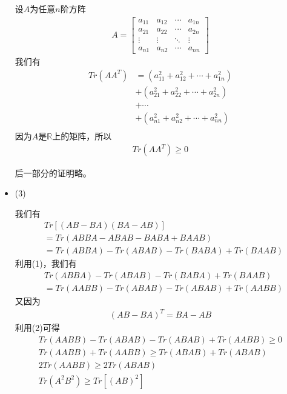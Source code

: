 \documentclass{article}
\begin{document}
\begin{itemize}
        设$A$为任意$n$阶方阵
        \begin{align*}
          A = \begin{bmatrix}
                a_{11} & a_{12} & \cdots & a_{1n} \\
                a_{21} & a_{22} & \cdots & a_{2n} \\
                \vdots & \vdots & \ddots & \vdots \\
                a_{n1} & a_{n2} & \cdots & a_{nn}
              \end{bmatrix}
        \end{align*}
        我们有
        \begin{align*}
          Tr(AA^T) & = (a_{11}^2 + a_{12}^2 + \cdots + a_{1n}^2) \\
                   & + (a_{21}^2 + a_{22}^2 + \cdots + a_{2n}^2) \\
                   & + \cdots                                    \\
                   & + (a_{n1}^2 + a_{n2}^2 + \cdots + a_{nn}^2) \\
        \end{align*}
        因为$A$是$\mathbb{R}$上的矩阵，所以
        \begin{align*}
          Tr(AA^T) \geq 0
        \end{align*}

        后一部分的证明略。

  \item (3)

        我们有
        \begin{align*}
           & Tr[(AB - BA)(BA - AB)]                      \\
           & = Tr(ABBA - ABAB - BABA + BAAB)             \\
           & = Tr(ABBA) - Tr(ABAB) - Tr(BABA) + Tr(BAAB)
        \end{align*}
        利用(1)，我们有
        \begin{align*}
           & Tr(ABBA) - Tr(ABAB) - Tr(BABA) + Tr(BAAB)   \\
           & = Tr(AABB) - Tr(ABAB) - Tr(ABAB) + Tr(AABB)
        \end{align*}
        又因为
        \begin{align*}
          (AB - BA)^T = BA - AB
        \end{align*}
        利用(2)可得
        \begin{align*}
          Tr(AABB) - Tr(ABAB) - Tr(ABAB) + Tr(AABB) \geq 0 \\
          Tr(AABB) + Tr(AABB) \geq Tr(ABAB) + Tr(ABAB)     \\
          2 Tr(AABB) \geq 2 Tr(ABAB)                       \\
          Tr(A^2B^2) \geq Tr[(AB)^2]
        \end{align*}
\end{itemize}
\end{document}
